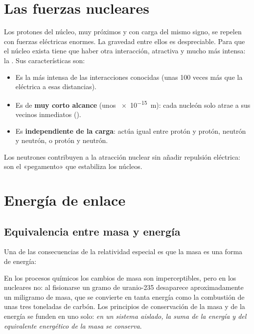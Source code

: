 \section{Las fuerzas nucleares}\label{sec:nuc-fuerzas}

Los protones del núcleo, muy próximos y con carga del mismo signo, se repelen con fuerzas eléctricas enormes. La gravedad entre
ellos es despreciable. Para que el núcleo exista tiene que haber otra interacción, atractiva y mucho más intensa: la
. Sus características son:
\begin{itemize}
    \item Es la más intensa de las interacciones conocidas (unas 100 veces más que la eléctrica a esas distancias).
    \item Es de \textbf{muy corto alcance} (unos \qty{e-15}{\m}): cada nucleón solo atrae a sus vecinos inmediatos ().
    \item Es \textbf{independiente de la carga}: actúa igual entre protón y protón, neutrón y neutrón, o protón y neutrón.
\end{itemize}
Los neutrones contribuyen a la atracción nuclear sin añadir repulsión eléctrica: son el «pegamento» que estabiliza los núcleos.

\section{Energía de enlace}\label{sec:nuc-enlace}

\subsection{Equivalencia entre masa y energía}\label{subsec:nuc-masa-energia}

Una de las consecuencias de la relatividad especial es que la masa es una forma de energía:
\begin{centeredequation}
     \label{eq:nuc-einstein}
\end{centeredequation}
En los procesos químicos los cambios de masa son imperceptibles, pero en los nucleares no: al fisionarse un gramo de uranio-235
desaparece aproximadamente un miligramo de masa, que se convierte en tanta energía como la combustión de unas tres toneladas de
carbón. Los principios de conservación de la masa y de la energía se funden en uno solo: \emph{en un sistema aislado, la suma de la
energía y del equivalente energético de la masa se conserva}.

